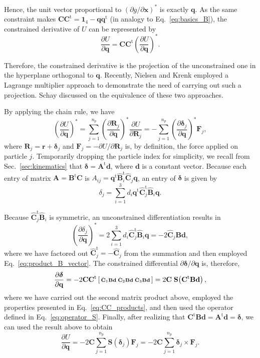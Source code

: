 \documentclass[aip,jcp,reprint,amsmath,amssymb]{revtex4-1}
\makeatletter
\newcommand{\mt}[1]{\boldsymbol{\mathbf{#1}}}           %
\newcommand{\vt}[1]{\boldsymbol{\mathbf{#1}}}           %
\newcommand{\tr}[1]{#1^\text{t}}                        %
\newcommand{\diff}[2]{\dfrac{\partial #1}{\partial #2}} %
\newenvironment{smallarray}[1]                          %
{\null\,\vcenter\bgroup\scriptsize
	\renewcommand{\arraystretch}{0.7}
	\arraycolsep=.13885em
	\hbox\bgroup$\array{@{}#1@{}}}
{\endarray$\egroup\egroup\,\null}
\makeatother
\begin{document}
Hence, the unit vector proportional to $(\partial g/\partial \vt x)^\ast$ is exactly $\vt q$. As the same constraint makes ${\mt C}\tr{\mt C} = \mt 1_4 - \vt q\tr{\vt q}$ (in analogy to Eq.~\ref{eq:basics_B}), the constrained derivative of $U$ can be represented by
\begin{equation}
\label{eq:diff_projection}
\diff{U}{\vt q} = {\mt C}\tr{\mt C} \left( \diff{U}{\vt q} \right)^\ast.
\end{equation}

Therefore, the constrained derivative is the projection of the unconstrained one in the hyperplane orthogonal to $\vt q$. Recently, Nielsen and Krenk\cite{Nielsen2012} employed a Lagrange multiplier approach to demonstrate the need of carrying out such a projection. Schay\cite{Schay1995, Schay1998} discussed on the equivalence of these two approaches.

By applying the chain rule, we have
\[
\left( \diff{U}{\vt q} \right)^\ast = \sum_{j=1}^{n_p} \left( \diff{\vt R_j}{\vt q} \right)^\ast \diff{U}{\vt R_j} = - \sum_{j=1}^{n_p} \left( \diff{\vt \delta_j}{\vt q} \right)^\ast {\vt F_j},
\]
where $\vt R_j = \vt r + \vt \delta_j$ and $\vt F_j = -\partial U/\partial \vt R_j$ is, by definition, the force applied on particle $j$. Temporarily dropping the particle index for simplicity, we recall from Sec.~\ref{sec:kinematics} that $\vt \delta = \tr{\mt A}\vt d$, where $\vt d$ is a constant vector. Because each entry of matrix $\mt A = \tr{\mt B}{\mt C}$ is $A_{ij}=\tr{\vt q} \tr{\hat{\mt B}}_i \hat{\mt C}_j {\vt q}$, an entry of $\vt \delta$ is given by
\[
\delta_j = \sum_{i=1}^{3} d_i \tr{\vt q} \tr{\hat{\mt C}}_j \hat{\mt B}_i {\vt q}.
\]

Because $\tr{\hat{\mt C}}_j \hat{\mt B}_i$ is symmetric, an unconstrained differentiation results in
\[
\left(\diff{\delta_j}{\vt q}\right)^\ast = 2 \sum_{i=1}^{3} d_i \tr{\hat{\mt C}}_j \hat{\mt B}_i {\vt q} = -2{\hat{\mt C}}_j {\mt B}{\vt d},
\]
where we have factored out $\tr{\hat{\mt C}}_j = -\hat{\mt C}_j$ from the summation and then employed Eq.~\ref{eq:product_B_vector}. The constrained differential $\partial \vt \delta/\partial \vt q$ is, therefore,
\[
\diff{\vt \delta}{\vt q} = -2{\mt C}\tr{\mt C}
\left[\begin{smallarray}{ccc}
{\hat{\mt C}}_1 {\mt B}{\vt d} & {\hat{\mt C}}_2 {\mt B}{\vt d} & {\hat{\mt C}}_3 {\mt B}{\vt d}
\end{smallarray}\right] = 2{\mt C}\;{\mt S}\!\left(\tr{\mt C}{\mt B}\vt d\right),
\]
where we have carried out the second matrix product above, employed the properties presented in Eq.~\ref{eq:CC_products}, and then used the operator defined in Eq.~\ref{eq:operator_S}. Finally, after realizing that $\tr{\mt C}{\mt B}\vt d = \tr{\mt A}{\vt d} = \vt \delta$, we can used the result above to obtain
\[
\diff{U}{\vt q} = - 2 \mt C \sum_{j=1}^{n_p} \mt S(\vt \delta_j) {\vt F_j}  = - 2 \mt C \sum_{j=1}^{n_p} \vt \delta_j \times {\vt F_j}.
\]
\end{document}
